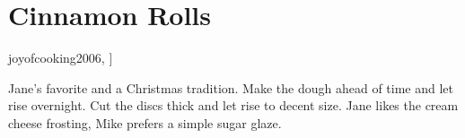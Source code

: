 \section{Cinnamon Rolls}

\begin{recipestats}[
        servings=16,
        preptime=1,
        bakingtime=cook time,
        inactivetime=12 \hour,
        source=Jane \& Mike,
        original=\citetitle{joyofcooking2006}~\cite[p.~621]{joyofcooking2006},
    ]
\end{recipestats}

\begin{recipeabstract}
    Jane's favorite and a Christmas tradition.
    Make the dough ahead of time and let rise overnight.
    Cut the discs thick and let rise to decent size.
    Jane likes the cream cheese frosting, Mike prefers a simple sugar glaze.
\end{recipeabstract}

\begin{ingredientcolumns}
    \begin{ingredientblock}[dough]
        \\
        \\
        \\
        \\
        \\
        \\
        \\
        \\
        \\
    \end{ingredientblock}

    \columnbreak
    \begin{ingredientblock}[filling]
        \\
        \\
        \\
    \end{ingredientblock}

    \medskip
    \begin{ingredientblock}[frosting]
        \\
        \\
        \\
    \end{ingredientblock}
\end{ingredientcolumns}

